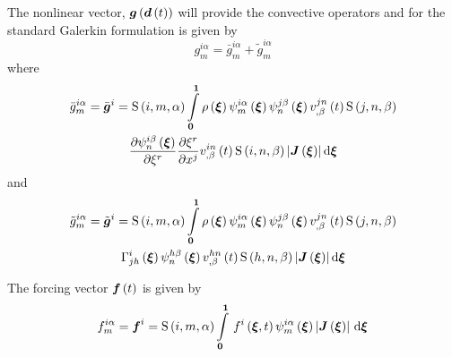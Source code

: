 The nonlinear vector, $  \boldsymbol{g} \left(   \boldsymbol{d} \left( t \right)  \right) $ will provide the
convective operators and for the standard Galerkin formulation is given by
\begin{equation}
  g^{i\alpha}_{m}=\bar{g}^{i\alpha}_{m}+\tilde{g}^{i\alpha}_{m}
\end{equation}
where
\begin{multline}
  \bar{g}^{i\alpha}_{m}=\bar{\vectr{g}}^{i}=\idxgsf{i}{m}{\alpha}\dintl{\vectr{0}}{\vectr{1}}\fnof{\rho}{\vectr{\xi}}
    \idxgbfn{i}{m}{\alpha}{\vectr{\xi}}\idxgbfn{j}{n}{\beta}{\vectr{\xi}}
    \fnof{\idxnodedof{v}{j}{n}{\beta}}{t}\idxgsf{j}{n}{\beta}\\
    \delby{\idxgbfn{i}{n}{\beta}{\vectr{\xi}}}{\xi^{r}}
    \delby{\xi^{r}}{x^{j}}\fnof{\idxnodedof{v}{i}{n}{\beta}}{t}\idxgsf{i}{n}{\beta}
    \abs{\fnof{\matr{J}}{\vectr{\xi}}}\exteriorderiv{\vectr{\xi}}
\end{multline}
and
\begin{multline}
  \tilde{g}^{i\alpha}_{m}=\tilde{\vectr{g}}^{i}=\idxgsf{i}{m}{\alpha}\dintl{\vectr{0}}{\vectr{1}}\fnof{\rho}{\vectr{\xi}}
    \idxgbfn{i}{m}{\alpha}{\vectr{\xi}}\idxgbfn{j}{n}{\beta}{\vectr{\xi}}
    \fnof{\idxnodedof{v}{j}{n}{\beta}}{t}\idxgsf{j}{n}{\beta}\\
    \fnof{\christoffel{i}{j}{h}}{\vectr{\xi}}
    \idxgbfn{h}{n}{\beta}{\vectr{\xi}}\fnof{\idxnodedof{v}{h}{n}{\beta}}{t}\idxgsf{h}{n}{\beta}
    \abs{\fnof{\matr{J}}{\vectr{\xi}}}\exteriorderiv{\vectr{\xi}}
\end{multline}

The forcing vector $  \boldsymbol{f} \left( t \right) $ is given by
\begin{equation}
  f^{i\alpha}_{m}=\vectr{f}^{i}=\idxgsf{i}{m}{\alpha}\gint{\vectr{0}}{\vectr{1}}{\fnof{f^{i}}{\vectr{\xi},t}\idxgbfn{i}{m}{\alpha}{\vectr{\xi}}\abs{\fnof{\matr{J}}{\vectr{\xi}}}}{\vectr{\xi}}
\end{equation}

